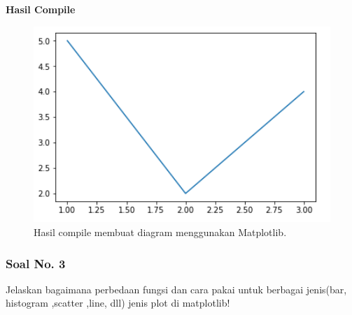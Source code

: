 \hfill \break
\textbf{Hasil Compile}

\begin{figure}[H]
	\includegraphics[width=12cm]{figures/6/1174042/1.png}
	\centering
	\caption{Hasil compile membuat diagram menggunakan Matplotlib.}
\end{figure}
 
\subsubsection{Soal No. 3}
\hfill \break
Jelaskan bagaimana perbedaan fungsi dan cara pakai untuk berbagai jenis(bar, histogram ,scatter ,line, dll) jenis plot di matplotlib!


